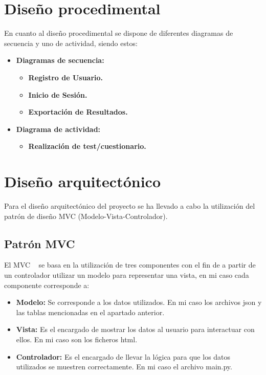 \section{Diseño procedimental}
En cuanto al diseño procedimental se dispone de diferentes diagramas de secuencia y uno de actividad, siendo estos:
\begin{itemize}
    \item \textbf{Diagramas de secuencia:}
    \begin{itemize}
        \item \textbf{Registro de Usuario.} 
        \item \textbf{Inicio de Sesión.}
        \item \textbf{Exportación de Resultados.}
    \end{itemize}
    \item \textbf{Diagrama de actividad:}
    \begin{itemize}
        \item \textbf{Realización de test/cuestionario.} 
    \end{itemize}
\end{itemize}


\section{Diseño arquitectónico}
Para el diseño arquitectónico del proyecto se ha llevado a cabo la utilización del patrón de diseño MVC (Modelo-Vista-Controlador).
\subsection{Patrón MVC}
El MVC ~\cite{wiki:MVC} se basa en la utilización de tres componentes con el fin de a partir de un controlador utilizar un modelo para representar una vista, en mi caso cada componente corresponde a:
\begin{itemize}
    \item \textbf{Modelo:} Se corresponde a los datos utilizados. En mi caso los archivos json y las tablas mencionadas en el apartado anterior.
    \item \textbf{Vista:} Es el encargado de mostrar los datos al usuario para interactuar con ellos. En mi caso son los ficheros html.
    \item \textbf{Controlador:} Es el encargado de llevar la lógica para que los datos utilizados se muestren correctamente. En mi caso el archivo main.py.
\end{itemize}
